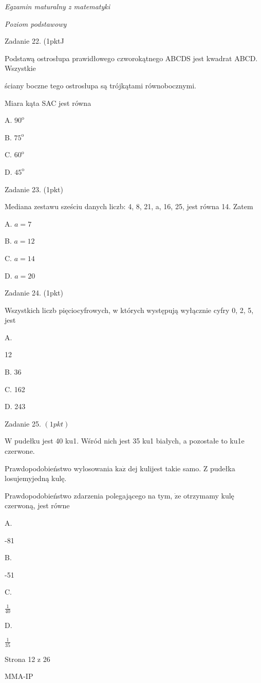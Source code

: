 \documentclass[a4paper,12pt]{article}
\begin{document}
{\it Egzamin maturalny z matematyki}

{\it Poziom podstawowy}

Zadanie 22. (1pktJ

Podstawą ostrosłupa prawidłowego czworokątnego ABCDS jest kwadrat ABCD. Wszystkie

ściany boczne tego ostrosłupa są trójkątami równobocznymi.

Miara kąta SAC jest równa

A. $90^{\mathrm{o}}$

B. $75^{\mathrm{o}}$

C. $60^{\mathrm{o}}$

D. $45^{\mathrm{o}}$

Zadanie 23. (1pkt)

Mediana zestawu sześciu danych liczb: 4, 8, 21, a, 16, 25, jest równa 14. Zatem

A. $a=7$

B. $a=12$

C. $a=14$

D. $a=20$

Zadanie 24. (1pkt)

Wszystkich liczb pięciocyfrowych, w których występują wyłącznie cyfry 0, 2, 5, jest

A.

12

B. 36

C. 162

D. 243

Zadanie 25. $(1pkt)$

$\mathrm{W}$ pudełku jest 40 ku1. Wśród nich jest 35 ku1 białych, a pozostałe to ku1e czerwone.

Prawdopodobieństwo wylosowania $\mathrm{k}\mathrm{a}\dot{\mathrm{z}}$ dej kulijest takie samo. $\mathrm{Z}$ pudełka losujemyjedną kulę.

Prawdopodobieństwo zdarzenia polegającego na tym, $\dot{\mathrm{z}}\mathrm{e}$ otrzymamy kulę czerwoną, jest równe

A.

-81

B.

-51

C.

$\displaystyle \frac{1}{40}$

D.

$\displaystyle \frac{1}{35}$

Strona 12 z 26

MMA-IP
\end{document}
